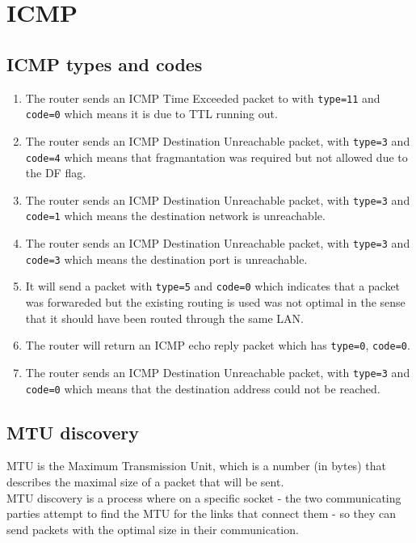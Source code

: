 \section{ICMP}
\subsection{ICMP types and codes}
\begin{enumerate}[label=\textbf{\alph*.}]
    \item The router sends an ICMP Time Exceeded packet to
    with \texttt{type=11} and \texttt{code=0} which means it is due to TTL running out.
    \item The router sends an ICMP Destination Unreachable packet,
    with \texttt{type=3} and \texttt{code=4} which means that fragmantation was required
    but not allowed due to the DF flag.
    \item The router sends an ICMP Destination Unreachable packet,
    with \texttt{type=3} and \texttt{code=1} which means the destination network is unreachable.
    \item The router sends an ICMP Destination Unreachable packet,
    with \texttt{type=3} and \texttt{code=3} which means
    the destination port is unreachable.
    \item It will send a packet with \texttt{type=5} and \texttt{code=0}
    which indicates that a packet was forwareded but the existing routing is used was not optimal in
    the sense that it should have been routed through the same LAN.
    \item The router will return an ICMP echo reply packet
    which has \texttt{type=0}, \texttt{code=0}.
    \item The router sends an ICMP Destination Unreachable packet,
    with \texttt{type=3} and \texttt{code=0} which
    means that the destination address could not be reached.
\end{enumerate}
\subsection{MTU discovery}
MTU is the Maximum Transmission Unit,
which is a number (in bytes) that describes the maximal size of a packet
that will be sent.\\
MTU discovery is a process where on a specific socket - the two communicating
parties attempt to find the MTU for the links that connect them - so
they can send packets with the optimal size in their communication.\\


